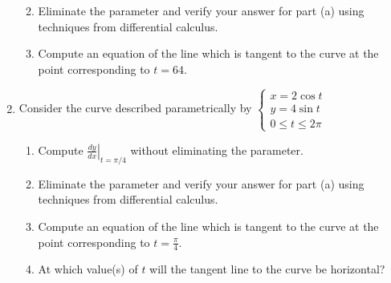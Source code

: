 \documentclass[12pt]{article}
\newif\ifans
\begin{document}
\begin{enumerate}
\begin{enumerate}
\ifans{\fbox{$\left.\frac{dy}{dx}\right|_{t=64}=\frac{1}{3}$}} \fi

\newpage

\item Eliminate the parameter and verify your answer for part (a) using techniques from differential calculus.

\ifans{\fbox{\parbox{1\linewidth}{The curve is equivalent to $y=x^{2/3}+1$, $x \geq 0$.  And, $t=64$ corresponds to $x=8$.  Thus, $\left.\frac{dy}{dx}\right|_{t=64}=\left.\frac{dy}{dx}\right|_{x=8}=\frac{1}{3}$}}} \fi

\item Compute an equation of the line which is tangent to the curve at the point corresponding to $t=64$.

\ifans{\fbox{$y-5=\frac{1}{3}(x-8)$}} \fi

\end{enumerate}

\item Consider the curve described parametrically by $\left\{\begin{array}{l}
x=2\cos{t}\\
y=4\sin{t}\\
0 \leq t \leq 2\pi \end{array}\right.$

\begin{enumerate}

\item Compute $\left.\frac{dy}{dx}\right|_{t=\pi/4}$ without eliminating the parameter.

\ifans{\fbox{$\left.\frac{dy}{dx}\right|_{t=\pi/4}=-2$}} \fi

\item Eliminate the parameter and verify your answer for part (a) using techniques from differential calculus.

\ifans{\fbox{\parbox{1\linewidth}{The curve is equivalent to the ellipse $\frac{x^2}{4}+\frac{y^2}{16}=1$.  And, $t=\frac{\pi}{4}$ corresponds to the point $(x,y)=(\sqrt{2},2\sqrt{2})$.  Thus, you can use implicit differentiation and $\left.\frac{dy}{dx}\right|_{t=\pi/4}=\left.\frac{dy}{dx}\right|_{(x,y)=\left(\sqrt{2},2\sqrt{2}\right)}=-2$}}} \fi

\item Compute an equation of the line which is tangent to the curve at the point corresponding to $t=\frac{\pi}{4}$.

\ifans{\fbox{$y-2\sqrt{2}=-2\left(x-\sqrt{2}\right)$}} \fi

\item At which value(s) of $t$ will the tangent line to the curve be horizontal?

\ifans{\fbox{$t=\frac{\pi}{2}$ and $t=\frac{3\pi}{2}$}} \fi

\end{enumerate}

\end{enumerate}
\end{document}
